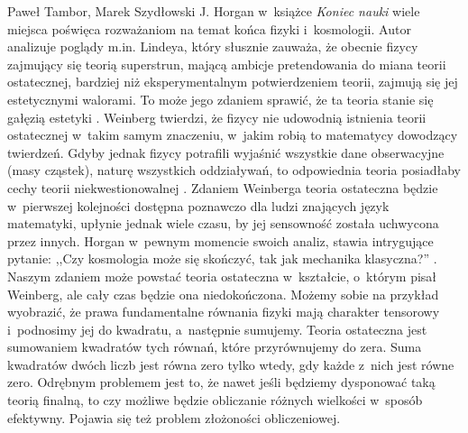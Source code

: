\begin{artplenv2auth}{Paweł Tambor, Marek Szydłowski}
J. Horgan w~książce \textit{Koniec nauki}
\parencite*[][]{horgan_koniec_1999} %
 wiele miejsca poświęca rozważaniom na temat końca fizyki i~kosmologii. Autor analizuje poglądy m.in. Lindeya, który słusznie zauważa, że obecnie fizycy zajmujący się teorią superstrun, mającą ambicje pretendowania do miana teorii ostatecznej, bardziej niż eksperymentalnym potwierdzeniem teorii, zajmują się jej estetycznymi walorami. To może jego zdaniem sprawić, że ta teoria stanie się gałęzią estetyki 
\parencite[][s.~94]{horgan_koniec_1999}. %
 Weinberg twierdzi, że fizycy nie udowodnią istnienia teorii ostatecznej w~takim samym znaczeniu, w~jakim robią to matematycy dowodzący twierdzeń. Gdyby jednak fizycy potrafili wyjaśnić wszystkie dane obserwacyjne (masy cząstek), naturę wszystkich oddziaływań, to odpowiednia teoria posiadłaby cechy teorii niekwestionowalnej 
\parencite[][s.~99]{horgan_koniec_1999}. %
 Zdaniem Weinberga teoria ostateczna będzie w~pierwszej kolejności dostępna poznawczo dla ludzi znających język matematyki, upłynie jednak wiele czasu, by jej sensowność została uchwycona przez innych. Horgan w~pewnym momencie swoich analiz, stawia intrygujące pytanie: ,,Czy kosmologia może się skończyć, tak jak mechanika klasyczna?'' 
\parencite[][s.~134]{horgan_koniec_1999}. %
 Naszym zdaniem może powstać teoria ostateczna w~kształcie, o~którym pisał Weinberg, ale cały czas będzie ona niedokończona. Możemy sobie na przykład wyobrazić, że prawa fundamentalne równania fizyki mają charakter tensorowy i~podnosimy jej do kwadratu, a~następnie sumujemy. Teoria ostateczna jest sumowaniem kwadratów tych równań, które przyrównujemy do zera. Suma kwadratów dwóch liczb jest równa zero tylko wtedy, gdy każde z~nich jest równe zero. Odrębnym problemem jest to, że nawet jeśli będziemy dysponować taką teorią finalną, to czy możliwe będzie obliczanie różnych wielkości w~sposób efektywny. Pojawia się też problem złożoności obliczeniowej.


\end{artplenv2auth}